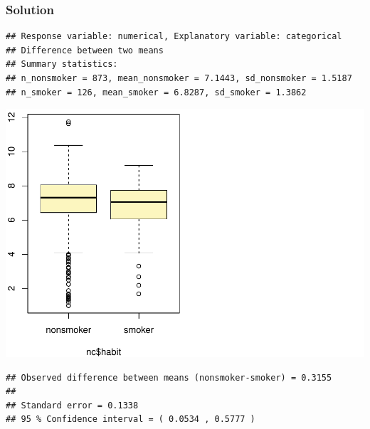 \documentclass[]{article}
\newenvironment{Shaded}{\begin{snugshade}}{\end{snugshade}}
\newcommand{\KeywordTok}[1]{\textcolor[rgb]{0.13,0.29,0.53}{\textbf{#1}}}
\newcommand{\DataTypeTok}[1]{\textcolor[rgb]{0.13,0.29,0.53}{#1}}
\newcommand{\DecValTok}[1]{\textcolor[rgb]{0.00,0.00,0.81}{#1}}
\newcommand{\StringTok}[1]{\textcolor[rgb]{0.31,0.60,0.02}{#1}}
\newcommand{\OperatorTok}[1]{\textcolor[rgb]{0.81,0.36,0.00}{\textbf{#1}}}
\newcommand{\NormalTok}[1]{#1}
\begin{document}
\subsubsection{Solution}\label{solution-4}

\begin{Shaded}
\end{Shaded}

\begin{verbatim}
## Response variable: numerical, Explanatory variable: categorical
## Difference between two means
## Summary statistics:
## n_nonsmoker = 873, mean_nonsmoker = 7.1443, sd_nonsmoker = 1.5187
## n_smoker = 126, mean_smoker = 6.8287, sd_smoker = 1.3862
\end{verbatim}

\includegraphics{DATA_606_Lab_5_files/figure-latex/unnamed-chunk-5-1.pdf}

\begin{verbatim}
## Observed difference between means (nonsmoker-smoker) = 0.3155
## 
## Standard error = 0.1338 
## 95 % Confidence interval = ( 0.0534 , 0.5777 )
\end{verbatim}
\end{document}

